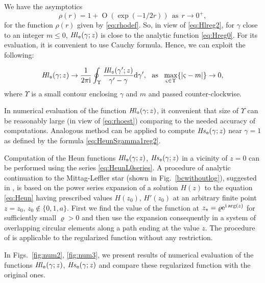 \documentclass[11pt]{article}
\newcommand{\MF}[1]{\mathop{\mbox{$#1$}}\nolimits}
\newcommand{\ii}{\kern0.05em\mathrm{i}\kern0.05em}
\newcommand{\E}[1]{\textrm{e}^{#1}}
\def\Heun{H}%
\def\HeunL{\MF{\textit{Hl\/}}}%
\def\HeunS{\MF{\textit{Hs\/}}}%
\def\regsgn{\scalebox{0.5}{\bf\sun}}
\begin{document}
We have the asymptotics
\begin{equation}
\rho(r)=1+\MF{O}(\exp(-1/2r))\ \ \mbox{as}\ \ r\to0^+,
\label{eq:rhoest}
\end{equation}
for the function $\rho(r)$ given by \eqref{eq:rhodef}.
So, in view of \eqref{eq:Hlreg2}, for $\gamma$ close to an integer $m\leq0$, $\HeunL_{\regsgn}(\gamma;z)$ is close to the analytic function \eqref{eq:Hreg0}. For its evaluation, it is convenient to use Cauchy formula. Hence, we can exploit the following:\begin{samepage}
\begin{equation*}
\HeunL_{\regsgn}(\gamma;z)\rightarrow\frac{1}{2\pi\mathrm{i}}
\oint_{\Upsilon}\frac{\HeunL_{\regsgn}(\gamma';z)}{\gamma'-\gamma}\textrm{d}\gamma',\ \
\mbox{as}\ \ \max_{\varsigma\in\Upsilon}\{|\varsigma-m|\}\to0,
\end{equation*}
where $\Upsilon$ is a small contour enclosing $\gamma$ and $m$ and passed counter-clockwise.\end{samepage} In numerical evaluation of the function $\HeunL_{\regsgn}(\gamma;z)$, it convenient that size of $\Upsilon$ can be reasonably large (in view of \eqref{eq:rhoest}) comparing to the needed accuracy of computations. Analogous method can be applied to compute $\HeunS_{\regsgn}(\gamma;z)$ near $\gamma=1$ as defined by the formula \eqref{eq:HeunSgamma1reg2}.

Computation of the Heun functions $\HeunL_{\regsgn}(\gamma;z)$, $\HeunS_{\regsgn}(\gamma;z)$ in a vicinity of $z=0$ can be performed using the series \eqref{eq:HeunL0series}. A procedure of analytic continuation to the Mittag-Leffler star (shown in Fig.~\ref{bcwithoutlog}), suggested in \cite{Mot15}, is based on  the power
series expansion of a solution $\Heun(z)$ to the equation
\eqref{eq:Heun} having prescribed values 
\mbox{$\Heun(z_0)$},
\mbox{$\Heun'(z_0)$}
at an arbitrary finite point $z=z_0$, $z_0\not\in\{0,1,a\}$. 
First we find the value of the function at $z_*=\varrho\E{\ii\arg(z)}$ for sufficiently small $\varrho>0$ and then use the expansion consequently in a system of overlapping circular elements along a path ending at the  value $z$. The procedure of \cite{Mot15} is applicable to the regularized function without any restriction.

In Figs.~\ref{fig:num2}, \ref{fig:num3}, we present results of numerical evaluation of the functions 
$\HeunL_{\regsgn}(\gamma;z)$, $\HeunS_{\regsgn}(\gamma;z)$ and compare these regularized function with the original ones.
\end{document}
